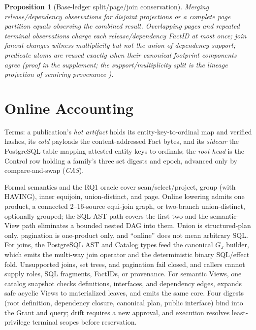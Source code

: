 \documentclass[10pt,journal,compsoc]{IEEEtran}
\newtheorem{proposition}{Proposition}
\begin{document}
\begin{proposition}[Base-ledger split/page/join conservation]
\label{thm:base-conservation}
Merging release/dependency observations for disjoint projections or a complete
page partition equals observing the combined result. Overlapping pages and
repeated terminal observations charge each release/dependency FactID at most
once; join fanout changes witness multiplicity but not the union of dependency
support; predicate atoms are reused exactly when their canonical footprint
components agree (proof in the supplement; the support/multiplicity split is
the lineage projection of semiring provenance
\cite{green2007provenance,amsterdamer2011aggregate}).
\end{proposition}

\section{Online Accounting}
\label{sec:online}

Terms: a publication's \emph{hot artifact} holds its entity-key-to-ordinal
map and verified hashes, its \emph{cold} payloads the content-addressed Fact
bytes, and its \emph{sidecar} the PostgreSQL table mapping attested entity
keys to ordinals; the \emph{root head} is the Control row holding a family's
three set digests and epoch, advanced only by compare-and-swap (\emph{CAS}).

Formal semantics and the RQ1 oracle cover scan/select/project, group (with
HAVING), inner equijoin, union-distinct, and page. Online lowering
admits one product, a connected 2--16-source equi-join graph, or two-branch
union-distinct, optionally grouped; the SQL-AST path covers the first two and
the semantic-View path eliminates a bounded nested DAG into them. Union is
structured-plan only, pagination is one-product only, and ``online'' does
not mean arbitrary SQL. For joins, the PostgreSQL AST and Catalog types
feed the canonical $G_J$ builder, which emits the multi-way join operator
and the deterministic binary SQL/effect fold. Unsupported joins, set trees,
and pagination fail closed, and callers cannot supply roles, SQL fragments,
FactIDs, or provenance. For semantic Views, one catalog snapshot checks
definitions, interfaces, and dependency edges, expands safe acyclic Views
to materialized leaves, and emits the same core. Four digests (root
definition, dependency closure, canonical plan, public interface) bind into
the Grant and query; drift requires a new approval, and execution resolves
least-privilege terminal scopes before reservation.
\end{document}
